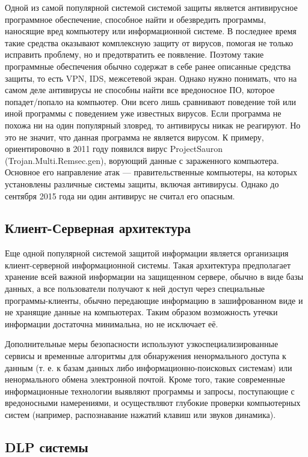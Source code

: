 Одной из самой популярной системой системой защиты является антивирусное программное обеспечение, способное найти и обезвредить программы, наносящие вред компьютеру или информационной системе. В последнее время такие средства оказывают комплексную защиту от вирусов, помогая не только исправить проблему, но и предотвратить ее появление. Поэтому такие программные обеспечения обычно содержат в себе ранее описанные средства защиты, то есть VPN, IDS, межсетевой экран. Однако нужно понимать, что на самом деле антивирусы не способны найти все вредоносное ПО, которое попадет/попало на компьютер. Они всего лишь сравнивают поведение той или иной программы с поведением уже известных вирусов. Если программа не похожа ни на один популярный зловред, то антивирусы никак не реагируют. Но это не значит, что данная программа не является вирусом. К примеру, ориентировочно в 2011 году появился вирус ProjectSauron (Trojan.Multi.Remsec.gen), ворующий данные с зараженного компьютера. Основное его направление атак --- правительственные компьютеры, на которых установлены различные системы защиты, включая антивирусы. Однако до сентября 2015 года ни один антивирус не считал его опасным.

\subsection{Клиент-Серверная архитектура}

Еще одной популярной системой защитой информации является организация клиент-серверной информационной системы. Такая архитектура предполагает хранение всей важной информации на защищенном сервере, обычно в виде базы данных, а все пользователи получают к ней доступ через специальные программы-клиенты, обычно передающие информацию в зашифрованном виде и не хранящие данные на компьютерах. Таким образом возможность утечки информации достаточна минимальна, но не исключает её.

Дополнительные меры безопасности используют узкоспециализированные сервисы и временные алгоритмы для обнаружения ненормального доступа к данным (т. е. к базам данных либо информационно-поисковых системам) или ненормального обмена электронной почтой. Кроме того, такие современные информационные технологии выявляют программы и запросы, поступающие с вредоносными намерениями, и осуществляют глубокие проверки компьютерных систем (например, распознавание нажатий клавиш или звуков динамика).

\subsection{DLP системы}


